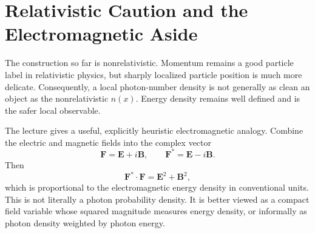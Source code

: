 \section{Relativistic Caution and the Electromagnetic Aside}

The construction so far is nonrelativistic. Momentum remains a good particle label in relativistic physics, but sharply localized particle position is much more delicate. Consequently, a local photon-number density is not generally as clean an object as the nonrelativistic \(n(x)\). Energy density remains well defined and is the safer local observable.

The lecture gives a useful, explicitly heuristic electromagnetic analogy. Combine the electric and magnetic fields into the complex vector
\begin{equation}
\mathbf F=\mathbf E+i\mathbf B,
\qquad
\mathbf F^*=\mathbf E-i\mathbf B.
\label{eq:l07-riemann-silberstein}
\end{equation}
Then
\begin{equation}
\mathbf F^*\mathbin{\cdot}\mathbf F
=\mathbf E^2+\mathbf B^2,
\label{eq:l07-em-density}
\end{equation}
which is proportional to the electromagnetic energy density in conventional units. This is not literally a photon probability density. It is better viewed as a compact field variable whose squared magnitude measures energy density, or informally as photon density weighted by photon energy.

\begin{classroomqa}
\end{classroomqa}

\begin{classroomqa}
\end{classroomqa}

